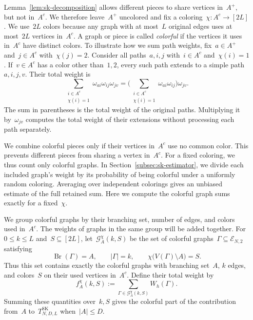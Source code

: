 \documentclass[letterpaper,11pt,reqno]{amsart}
\renewcommand{\leq}{\leqslant}
\DeclareMathOperator{\Br}{Br}
\begin{document}
Lemma~\ref{lem:sk-decomposition} allows different pieces to share vertices in~$A^+$, but not in~$A^c$. We therefore leave~$A^+$ uncolored and fix a coloring~$\chi:A^c\to[2L]$. We use~$2L$ colors because any graph with at most~$L$ original edges uses at most~$2L$ vertices in~$A^c$. A graph or piece is called \emph{colorful} if the vertices it uses in~$A^c$ have distinct colors. To illustrate how we sum path weights, fix~$a\in A^+$ and~$j\in A^c$ with~$\chi(j)=2$. Consider all paths~$a,i,j$ with~$i\in A^c$ and~$\chi(i)=1$. If~$v\in A^c$ has a color other than~$1,2$, every such path extends to a simple path~$a,i,j,v$. Their total weight is
\begin{equation*}
\sum_{\substack{i\in A^c\\\chi(i)=1}}\omega_{ai}\omega_{ij}\omega_{jv}
=\Bigg(\sum_{\substack{i\in A^c\\\chi(i)=1}}\omega_{ai}\omega_{ij}\Bigg)\omega_{jv}.
\end{equation*}
The sum in parentheses is the total weight of the original paths. Multiplying it by~$\omega_{jv}$ computes the total weight of their extensions without processing each path separately.

We combine colorful pieces only if their vertices in~$A^c$ use no common color. This prevents different pieces from sharing a vertex in~$A^c$. For a fixed coloring, we thus count only colorful graphs. In Section~\ref{subsec:sk-estimator}, we divide each included graph's weight by its probability of being colorful under a uniformly random coloring. Averaging over independent colorings gives an unbiased estimate of the full retained sum. Here we compute the colorful graph sums exactly for a fixed~$\chi$.

We group colorful graphs by their branching set, number of edges, and colors used in~$A^c$. The weights of graphs in the same group will be added together.
For~$0\leq k\leq L$ and~$S\subseteq[2L]$, let~$\mathcal G_A^\chi(k,S)$ be the set of colorful graphs~$\Gamma\subseteq\mathcal E_{N,2}$ satisfying
\begin{equation*}
\Br(\Gamma)=A,\qquad |\Gamma|=k,\qquad \chi\bigl(V(\Gamma)\setminus A\bigr)=S.
\end{equation*}
Thus this set contains exactly the colorful graphs with branching set~$A$, $k$ edges, and colors~$S$ on their used vertices in~$A^c$. Define their total weight by
\begin{equation}\label{eq:sk-colorful-identity}
f_A^\chi(k,S):=\sum_{\Gamma\in\mathcal G_A^\chi(k,S)}W_h(\Gamma).
\end{equation}
Summing these quantities over~$k,S$ gives the colorful part of the contribution from~$A$ to~$T^{\mathrm{SK}}_{N,D,L}$ when~$|A|\leq D$.
\end{document}
